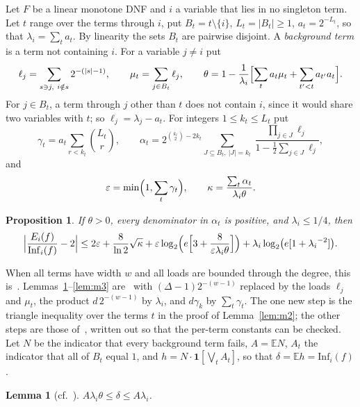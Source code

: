 \documentclass[11pt]{amsart}
\newtheorem{lemma}[theorem]{Lemma}
\newtheorem{proposition}[theorem]{Proposition}
\theoremstyle{remark}
\newcommand{\Inf}{\mathrm{Inf}}
\newcommand{\E}{\mathbb{E}}
\begin{document}
Let $F$ be a linear monotone DNF and $i$ a variable that lies in no singleton term. Let $t$ range over the terms
through $i$, put $B_t=t\setminus\{i\}$, $L_t=|B_t|\ge1$, $a_t=2^{-L_t}$, so that $\lambda_i=\sum_ta_t$. By linearity the
sets $B_t$ are pairwise disjoint. A \emph{background term} is a term not containing $i$. For a variable $j\ne i$ put
\[
\ell_j=\sum_{s\ni j,\ i\notin s}2^{-(|s|-1)},\qquad \mu_t=\sum_{j\in B_t}\ell_j,\qquad
\theta=1-\frac1{\lambda_i}\Bigl[\sum_ta_t\mu_t+\sum_{t'<t}a_{t'}a_t\Bigr].
\]
For $j\in B_t$, a term through $j$ other than $t$ does not contain $i$, since it would share two variables with $t$;
so $\ell_j=\lambda_j-a_t$. For integers $1\le k_t\le L_t$ put
\[
\gamma_t=a_t\sum_{r<k_t}\binom{L_t}r,\qquad
\alpha_t=2^{\binom{k_t}2-2k_t}\sum_{J\subseteq B_t,\ |J|=k_t}\ \frac{\prod_{j\in J}\ell_j}{1-\frac12\sum_{j\in J}\ell_j},
\]
and
\[
\varepsilon=\min\Bigl(1,\sum_t\gamma_t\Bigr),\qquad \kappa=\frac{\sum_t\alpha_t}{{\lambda_i}\theta}.
\]

\begin{proposition}\label{prop:mix}
If $\theta>0$, every denominator in $\alpha_t$ is positive, and ${\lambda_i}\le1/4$, then
\[
\Bigl|\frac{E_i(f)}{\Inf_i(f)}-2\Bigr|\le2\varepsilon+\frac8{\ln2}\sqrt\kappa
+\varepsilon\log_2\Bigl(e\Bigl[3+\frac8{\varepsilon {\lambda_i}\theta}\Bigr]\Bigr)+{\lambda_i}\log_2\bigl(e[1+{\lambda_i}^{-2}]\bigr).
\]
\end{proposition}

When all terms have width $w$ and all loads are bounded through the degree, this is~\cite[Theorem~6]{Shm6}.
Lemmas~\ref{lem:m1}--\ref{lem:m3} are~\cite[Lemmas~3--5]{Shm6} with $(\Delta-1)2^{-(w-1)}$ replaced by the loads $\ell_j$
and $\mu_t$, the product $d\,2^{-(w-1)}$ by $\lambda_i$, and $d\gamma_k$ by $\sum_t\gamma_t$. The one new step is the
triangle inequality over the terms $t$ in the proof of Lemma~\ref{lem:m2}; the other steps are those of~\cite{Shm6},
written out so that the per-term constants can be checked. Let $N$ be the indicator that every background term fails,
$A=\E N$, $A_t$ the indicator that all of $B_t$ equal $1$, and $h=N\cdot\mathbf 1[\bigvee_tA_t]$, so that
$\delta=\E h=\Inf_i(f)$.

\begin{lemma}[{cf.~\cite[Lemma~3]{Shm6}}]\label{lem:m1}
$A{\lambda_i}\theta\le\delta\le A{\lambda_i}$.
\end{lemma}
\end{document}
